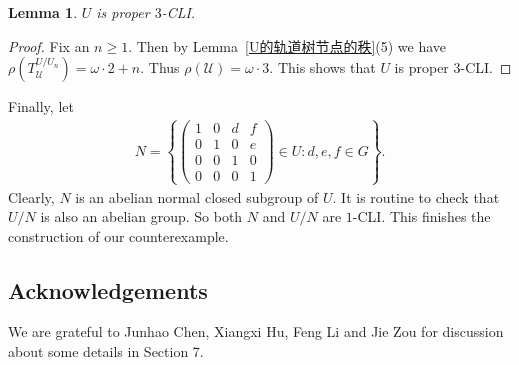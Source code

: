 \documentclass[11pt]{amsart}
\newtheorem{lemma}[theorem]{Lemma}
\theoremstyle{definition}
\theoremstyle{remark}
\numberwithin{equation}{section}
\def\hier#1{$#1$-CLI}
\def\otr#1#2{T_{\mathcal{#1}}^{#2}}
\begin{document}
\begin{lemma}
    $U$ is proper \hier3.
\end{lemma}

\begin{proof}
    Fix an $n\geq 1$. Then by Lemma~\ref{U的轨道树节点的秩}(5) we have $\rho(\otr{U}{U/U_n})=\omega\cdot 2+n$. Thus $\rho(\mathcal{U})=\omega\cdot 3$. This shows that $U$ is proper \hier3.
\end{proof}

Finally, let
\begin{align*}
    N=\left\{
    \begin{pmatrix}
        1 & 0 & d & f\\
        0 & 1 & 0 & e\\
        0 & 0 & 1 & 0\\
        0 & 0 & 0 & 1
    \end{pmatrix}\in U:d,e,f\in G\right\}.
\end{align*}
Clearly, $N$ is an abelian normal closed subgroup of $U$. It is routine to check that $U/N$ is also an abelian group. So both $N$ and $U/N$ are \hier1. This finishes the construction of our counterexample.

\subsection*{Acknowledgements}
We are grateful to Junhao Chen, Xiangxi Hu, Feng Li and Jie Zou for discussion about some details in Section 7.
\end{document}
